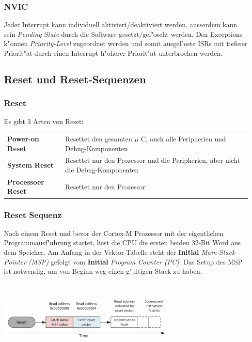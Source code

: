 \subsubsection{NVIC}
Jeder Interrupt kann individuell aktiviert/deaktiviert werden, ausserdem kann sein \textit{Pending State} durch die Software gesetzt/gel"oscht werden. Den Exceptions k"onnen \textit{Priority-Level} zugeordnet werden und somit ausgel"oste ISRs mit tieferer Priorit"at durch einen Interrupt h"oherer Priorit"at unterbrochen werden.
\subsection{Reset und Reset-Sequenzen}
\subsubsection{Reset}
Es gibt 3 Arten von Reset:\\
\begin{tabular}{ll}
    \textbf{Power-on Reset}  & Resettet den gesamten $\mu$ C, auch alle Peripherien und Debug-Komponenten \\ 
    \textbf{System Reset}    & Resettet nur den Prozessor und die Peripherien, aber nicht die Debug-Komponenten \\ 
    \textbf{Processoer Reset} & Resettet nur den Prozessor\\
\end{tabular}

\subsubsection{Reset Sequenz}
\begin{minipage}{9cm}
	Nach einem Reset und bevor der Cortex-M Prozessor mit der eigentlichen Programmausf"uhrung startet, liest die CPU die ersten beiden 32-Bit Word aus dem Speicher. Am Anfang in der Vektor-Tabelle steht der \textbf{Initial} \textit{Main-Stack-Pointer (MSP)} gefolgt vom \textbf{Initial} \textit{Program Counter (PC)}. Das Setup des MSP ist notwendig, um von Beginn weg einen g"ultigen Stack zu haben.
\end{minipage}
%
\begin{minipage}{0.5cm}
	\-\
\end{minipage}
%
\begin{minipage}{9cm}
	\includegraphics[width=9cm]{images/resetsequenz}
\end{minipage}

